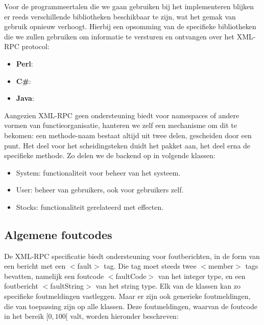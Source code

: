 Voor de programmeertalen die we gaan gebruiken bij het implementeren blijken er reeds verschillende bibliotheken beschikbaar te zijn, wat het gemak van gebruik opnieuw verhoogt. Hierbij een opsomming van de specifieke bibliotheken die we zullen gebruiken om informatie te versturen en ontvangen over het XML-RPC protocol:
\begin{itemize}
\item{\textbf{Perl}: }
\item{\textbf{C\#}: }
\item{\textbf{Java}: }
\end{itemize}

Aangezien XML-RPC geen ondersteuning biedt voor namespaces of andere vormen van functieorganisatie, hanteren we zelf een mechanisme om dit te bekomen: een methode-naam bestaat altijd uit twee delen, gescheiden door een punt. Het deel voor het scheidingsteken duidt het pakket aan, het deel erna de specifieke methode.
Zo delen we de backend op in volgende klassen:
\begin{itemize}
\item{System: functionaliteit voor beheer van het systeem.}
\item{User: beheer van gebruikers, ook voor gebruikers zelf.}
\item{Stocks: functionaliteit gerelateerd met effecten.}
\end{itemize}

\subsection{Algemene foutcodes}

De XML-RPC specificatie biedt ondersteuning voor foutberichten, in de form van een bericht met een $<$fault$>$ tag. Die tag moet steeds twee $<$member$>$ tags bevatten, namelijk een foutcode $<$faultCode$>$ van het integer type, en een foutbericht $<$faultString$>$ van het string type. Elk van de klassen kan zo specifieke foutmeldingen vastleggen.
Maar er zijn ook generieke foutmeldingen, die van toepassing zijn op alle klassen. Deze foutmeldingen, waarvan de foutcode in het bereik $[0, 100[$ valt, worden hieronder beschreven:

